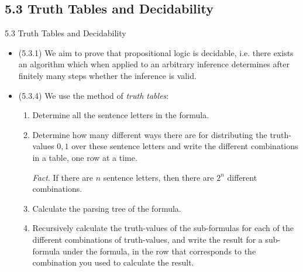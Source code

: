 \subsection{5.3 Truth Tables and Decidability}
\begin{frame}{5.3 Truth Tables and Decidability}

	\begin{itemize}
	
		\item (5.3.1) We aim to prove that propositional logic is decidable, i.e. there exists an algorithm which when applied to an arbitrary inference determines after finitely many steps whether the inference is valid.
		
		\item (5.3.4) We use the method of \emph{truth tables}:
		
		\begin{enumerate}[1.]
		
			\item Determine all the sentence letters in the formula.
			
			\item Determine how many different ways there are for distributing the truth-values $0,1$ over these sentence letters and write the different combinations in a table, one row at a time. 
			
			\emph{Fact}. If there are $n$ sentence letters, then there are $2^n$ different combinations. 
			
			\item Calculate the parsing tree of the formula.
			
			\item Recursively calculate the truth-values of the sub-formulas for each of the different combinations of truth-values, and write the result for a sub-formula under the formula, in the row that corresponds to the combination you used to calculate the result. 
		\end{enumerate}
	
	\end{itemize}


\end{frame}

